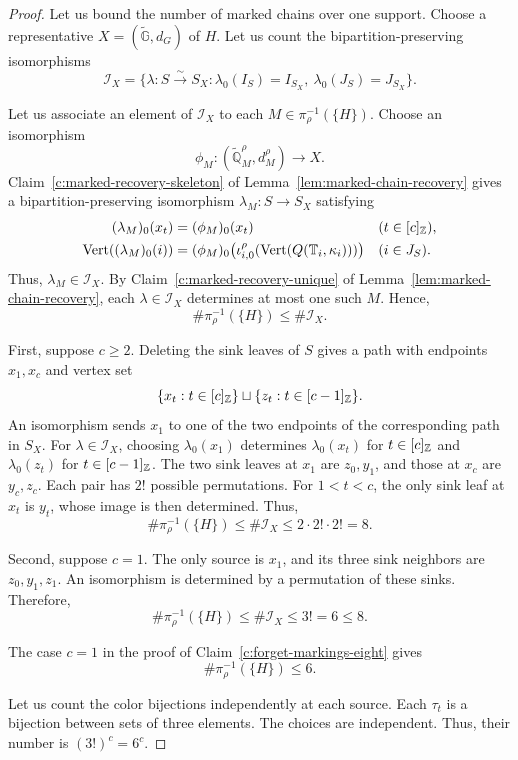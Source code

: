 \begin{proof}
 Let us bound the number of marked chains over one support.
Choose a representative $X=(\widetilde{\mathbb G},d_G)$ of $H$.
Let us count the bipartition-preserving isomorphisms
\[
 \mathcal I_X=\{\lambda:S\xrightarrow{\sim}S_X:
 \lambda_0(I_S)=I_{S_X},\ \lambda_0(J_S)=J_{S_X}\}.
\]

Let us associate an element of $\mathcal I_X$ to each $M\in\pi_\rho^{-1}(\{H\})$.
Choose an isomorphism
\[
 \phi_M:(\widetilde{\mathbb Q}_M^\rho,d_M^\rho)\longrightarrow X.
\]
Claim~\ref{c:marked-recovery-skeleton} of Lemma~\ref{lem:marked-chain-recovery} gives a bipartition-preserving isomorphism $\lambda_M:S\to S_X$ satisfying
\[
 \begin{aligned}
 (\lambda_M)_0(x_t)&=(\phi_M)_0(x_t)&& (t\in[c]_{\mathbb Z}),\\
 \operatorname{Vert}((\lambda_M)_0(i))
 &=(\phi_M)_0\bigl(\iota_{i,0}^\rho(\operatorname{Vert}(Q(\mathbb T_i,\kappa_i)))\bigr)
 &&(i\in J_S).
 \end{aligned}
\]
Thus, $\lambda_M\in\mathcal I_X$.
By Claim~\ref{c:marked-recovery-unique} of Lemma~\ref{lem:marked-chain-recovery}, each $\lambda\in\mathcal I_X$ determines at most one such $M$.
Hence,
\[
 \#\pi_\rho^{-1}(\{H\})\le\#\mathcal I_X.
\]

First, suppose $c\ge2$. Deleting the sink leaves of $S$ gives a path with endpoints $x_1,x_c$ and vertex set
\[
 \{x_t:t\in[c]_{\mathbb Z}\}\sqcup\{z_t:t\in[c-1]_{\mathbb Z}\}.
\]
An isomorphism sends $x_1$ to one of the two endpoints of the corresponding path in $S_X$.
For $\lambda\in\mathcal I_X$, choosing $\lambda_0(x_1)$ determines
$\lambda_0(x_t)$ for $t\in[c]_{\mathbb Z}$ and $\lambda_0(z_t)$ for $t\in[c-1]_{\mathbb Z}$.
The two sink leaves at $x_1$ are $z_0,y_1$, and those at $x_c$ are $y_c,z_c$.
Each pair has $2!$ possible permutations.
For $1<t<c$, the only sink leaf at $x_t$ is $y_t$, whose image is then determined.
Thus,
\[
 \#\pi_\rho^{-1}(\{H\})\le\#\mathcal I_X
 \le2\cdot2!\cdot2!=8.
\]

Second, suppose $c=1$. The only source is $x_1$, and its three sink neighbors are $z_0,y_1,z_1$.
An isomorphism is determined by a permutation of these sinks. Therefore,
\[
 \#\pi_\rho^{-1}(\{H\})\le\#\mathcal I_X\le3!=6\le8.
\]

The case $c=1$ in the proof of Claim~\ref{c:forget-markings-eight} gives
\[
 \#\pi_\rho^{-1}(\{H\})\le6.
\]

 Let us count the color bijections independently at each source.
Each $\tau_t$ is a bijection between
sets of three elements. The choices are independent. Thus, their number is
$(3!)^c=6^c$.


\end{proof}
